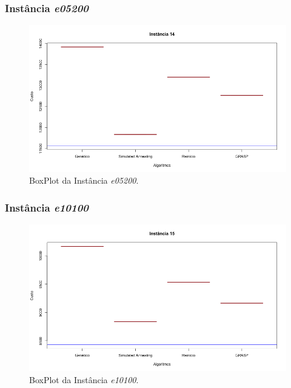 \documentclass[portugues, brazil, a4paper,12pt]{article}
\begin{document}
		\subsubsection{Instância \textit{e05200}}
			\begin{figure}[H]
				\centering
				\includegraphics[width=1\linewidth]{img/14.png}
				\caption{BoxPlot da Instância \textit{e05200}.}
				\label{fig:e05200}
			\end{figure}
	
		\subsubsection{Instância \textit{e10100}}
			\begin{figure}[H]
				\centering
				\includegraphics[width=1\linewidth]{img/15.png}
				\caption{BoxPlot da Instância \textit{e10100}.}
				\label{fig:e10100}
			\end{figure}
	
\end{document}
